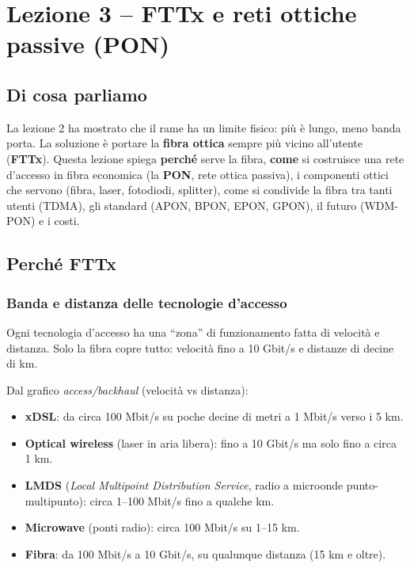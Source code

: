 \chapter{Lezione 3 -- FTTx e reti ottiche passive (PON)}

\section{Di cosa parliamo}

La lezione 2 ha mostrato che il rame ha un limite fisico: più è lungo, meno banda porta. La soluzione è portare la \textbf{fibra ottica} sempre più vicino all'utente (\textbf{FTTx}). Questa lezione spiega \textbf{perché} serve la fibra, \textbf{come} si costruisce una rete d'accesso in fibra economica (la \textbf{PON}, rete ottica passiva), i componenti ottici che servono (fibra, laser, fotodiodi, splitter), come si condivide la fibra tra tanti utenti (TDMA), gli standard (APON, BPON, EPON, GPON), il futuro (WDM-PON) e i costi.

\section{Perché FTTx}

\subsection{Banda e distanza delle tecnologie d'accesso}

\begin{inbreve}

Ogni tecnologia d'accesso ha una ``zona'' di funzionamento fatta di velocità e distanza. Solo la fibra copre tutto: velocità fino a 10 Gbit/s e distanze di decine di km.

\end{inbreve}

Dal grafico \emph{access/backhaul} (velocità vs distanza):

\begin{itemize}
\tightlist
\item
  \textbf{xDSL}: da circa 100 Mbit/s su poche decine di metri a 1 Mbit/s verso i 5 km.
\item
  \textbf{Optical wireless} (laser in aria libera): fino a 10 Gbit/s ma solo fino a circa 1 km.
\item
  \textbf{LMDS} (\emph{Local Multipoint Distribution Service}, radio a microonde punto-multipunto): circa 1--100 Mbit/s fino a qualche km.
\item
  \textbf{Microwave} (ponti radio): circa 100 Mbit/s su 1--15 km.
\item
  \textbf{Fibra}: da 100 Mbit/s a 10 Gbit/s, su qualunque distanza (15 km e oltre).
\end{itemize}

